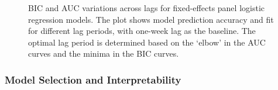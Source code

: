 \documentclass[
  number,
  preprint,
  3p,
  onecolumn]{elsarticle}
\begin{document}
\begin{figure}

\begin{minipage}{0.50\linewidth}



\end{minipage}%
%
\begin{minipage}{0.50\linewidth}



\end{minipage}%
\newline
\begin{minipage}{0.50\linewidth}



\end{minipage}%
%
\begin{minipage}{0.50\linewidth}



\end{minipage}%

\caption{\label{fig-panel-bic}BIC and AUC variations across lags for
fixed-effects panel logistic regression models. The plot shows model
prediction accuracy and fit for different lag periods, with one-week lag
as the baseline. The optimal lag period is determined based on the
`elbow' in the AUC curves and the minima in the BIC curves.}

\end{figure}%

\subsubsection{Model Selection and
Interpretability}\label{model-selection-and-interpretability}
\end{document}
